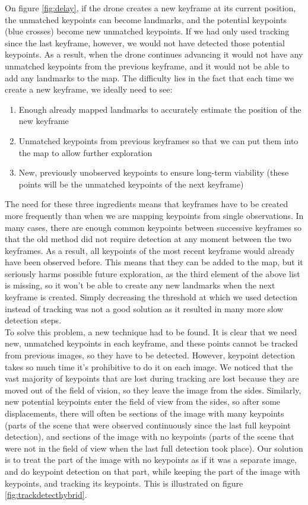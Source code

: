On figure \ref{fig:delay}, if the drone creates a new keyframe at its current position, the unmatched keypoints can become landmarks, and the potential keypoints (blue crosses) become new unmatched keypoints. If we had only used tracking since the last keyframe, however, we would not have detected those potential keypoints. As a result, when the drone continues advancing it would not have any unmatched keypoints from the previous keyframe, and it would not be able to add any landmarks to the map. The difficulty lies in the fact that each time we create a new keyframe, we ideally need to see:

\begin{enumerate}
\item Enough already mapped landmarks to accurately estimate the position of the new keyframe
\item Unmatched keypoints from previous keyframes so that we can put them into the map to allow further exploration
\item New, previously unobserved keypoints to ensure long-term viability (these points will be the unmatched keypoints of the next keyframe)
\end{enumerate}

The need for these three ingredients means that keyframes have to be created more frequently than when we are mapping keypoints from single observations. In many cases, there are enough common keypoints between successive keyframes so that the old method did not require detection at any moment between the two keyframes. As a result, all keypoints of the most recent keyframe would already have been observed before. This means that they can be added to the map, but it seriously harms possible future exploration, as the third element of the above list is missing, so it won't be able to create any new landmarks when the next keyframe is created. Simply decreasing the threshold at which we used detection instead of tracking was not a good solution as it resulted in many more slow detection steps.\\

To solve this problem, a new technique had to be found. It is clear that we need new, unmatched keypoints in each keyframe, and these points cannot be tracked from previous images, so they have to be detected. However, keypoint detection takes so much time it's prohibitive to do it on each image. We noticed that the vast majority of keypoints that are lost during tracking are lost because they are moved out of the field of vision, so they leave the image from the sides. Similarly, new potential keypoints enter the field of view from the sides, so after some displacements, there will often be sections of the image with many keypoints (parts of the scene that were observed continuously since the last full keypoint detection), and sections of the image with no keypoints (parts of the scene that were not in the field of view when the last full detection took place). Our solution is to treat the part of the image with no keypoints as if it was a separate image, and do keypoint detection on that part, while keeping the part of the image with keypoints, and tracking its keypoints. This is illustrated on figure \ref{fig:trackdetecthybrid}.

